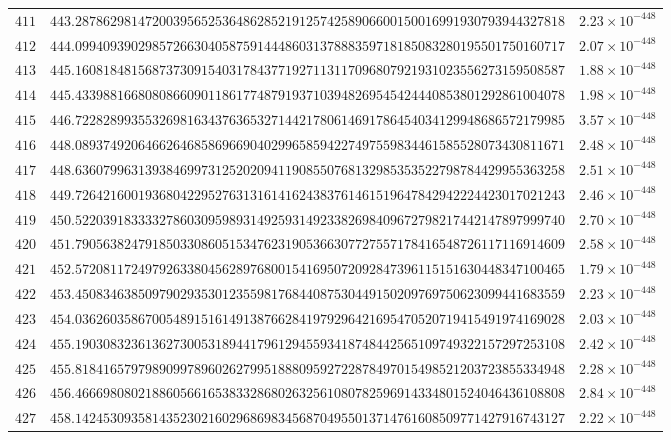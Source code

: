 \documentclass[12pt,reqno]{amsart}
\theoremstyle{remark}
\begin{document}
\begin{longtable}{clc}
$411$ & $443.2878629814720039565253648628521912574258906600150016991930793944327818$ & $2.23\times 10^{-448}$ \\
$412$ & $444.0994093902985726630405875914448603137888359718185083280195501750160717$ & $2.07\times 10^{-448}$ \\
$413$ & $445.1608184815687373091540317843771927113117096807921931023556273159508587$ & $1.88\times 10^{-448}$ \\
$414$ & $445.4339881668080866090118617748791937103948269545424440853801292861004078$ & $1.98\times 10^{-448}$ \\
$415$ & $446.7228289935532698163437636532714421780614691786454034129948686572179985$ & $3.57\times 10^{-448}$ \\
$416$ & $448.0893749206466264685869669040299658594227497559834461585528073430811671$ & $2.48\times 10^{-448}$ \\
$417$ & $448.6360799631393846997312520209411908550768132985353522798784429955363258$ & $2.51\times 10^{-448}$ \\
$418$ & $449.7264216001936804229527631316141624383761461519647842942224423017021243$ & $2.46\times 10^{-448}$ \\
$419$ & $450.5220391833332786030959893149259314923382698409672798217442147897999740$ & $2.70\times 10^{-448}$ \\
$420$ & $451.7905638247918503308605153476231905366307727557178416548726117116914609$ & $2.58\times 10^{-448}$ \\
$421$ & $452.5720811724979263380456289768001541695072092847396115151630448347100465$ & $1.79\times 10^{-448}$ \\
$422$ & $453.4508346385097902935301235598176844087530449150209769750623099441683559$ & $2.23\times 10^{-448}$ \\
$423$ & $454.0362603586700548915161491387662841979296421695470520719415491974169028$ & $2.03\times 10^{-448}$ \\
$424$ & $455.1903083236136273005318944179612945593418748442565109749322157297253108$ & $2.42\times 10^{-448}$ \\
$425$ & $455.8184165797989099789602627995188809592722878497015498521203723855334948$ & $2.28\times 10^{-448}$ \\
$426$ & $456.4666980802188605661653833286802632561080782596914334801524046436108808$ & $2.84\times 10^{-448}$ \\
$427$ & $458.1424530935814352302160296869834568704955013714761608509771427916743127$ & $2.22\times 10^{-448}$ \\

\end{longtable}
\end{document}
